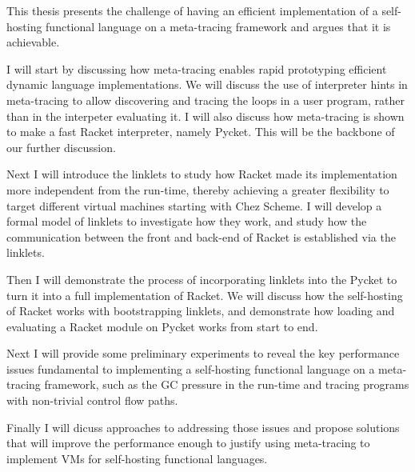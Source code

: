 This thesis presents the challenge of having an efficient
implementation of a self-hosting functional language on a meta-tracing
framework and argues that it is achievable.

I will start by discussing how meta-tracing enables rapid prototyping
efficient dynamic language implementations. We will discuss the use of
interpreter hints in meta-tracing to allow discovering and tracing the
loops in a user program, rather than in the interpeter evaluating
it. I will also discuss how meta-tracing is shown to make a fast
Racket interpreter, namely Pycket. This will be the backbone of our
further discussion.

Next I will introduce the linklets to study how Racket made its
implementation more independent from the run-time, thereby achieving a
greater flexibility to target different virtual machines starting with
Chez Scheme. I will develop a formal model of linklets to investigate
how they work, and study how the communication between the front and
back-end of Racket is established via the linklets.

Then I will demonstrate the process of incorporating linklets into the
Pycket to turn it into a full implementation of Racket. We will
discuss how the self-hosting of Racket works with bootstrapping
linklets, and demonstrate how loading and evaluating a Racket module
on Pycket works from start to end.

Next I will provide some preliminary experiments to reveal the key
performance issues fundamental to implementing a self-hosting
functional language on a meta-tracing framework, such as the GC
pressure in the run-time and tracing programs with non-trivial control
flow paths.

Finally I will dicuss approaches to addressing those issues and
propose solutions that will improve the performance enough to justify
using meta-tracing to implement VMs for self-hosting functional
languages.
